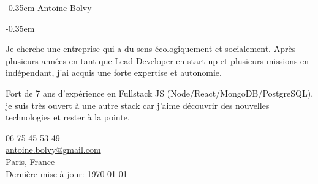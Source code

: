\documentclass[
  french,
  a4paper
]{resume-openfont}
\begin{document}
\noindent%
\begin{minipage}{.7\textwidth}
\kern-0.35em
{
  \fontsize{24}{24}
  \selectfont Antoine Bolvy\\
}

\kern-0.35em
{
  \parskip2pt
  \fontsize{8pt}{10pt}
  \selectfont Je cherche une entreprise qui a du sens écologiquement et socialement. Après plusieurs années en tant que Lead Developer en start-up et plusieurs missions en indépendant, j'ai acquis une forte expertise et autonomie.\par
  Fort de 7 ans d'expérience en Fullstack JS (Node/React/MongoDB/PostgreSQL), je suis très ouvert à une autre stack car j'aime découvrir des nouvelles technologies et rester à la pointe.
}%
\vspace{12pt}


\end{minipage}%
\begin{minipage}{.3\textwidth}
\begin{flushright}
\vspace{-28pt}
\color{headings}\href{tel:+33675455349}{06 75 45 53 49}\\
\href{mailto:antoine.bolvy@gmail.com}{antoine.bolvy@gmail.com}\\
Paris, France\\
{\color{date}\fontsize{7pt}{12pt}\selectfont{}Dernière mise à jour: \today}
\end{flushright}
\end{minipage}

\vspace{-4pt}
\noindent\makebox[\linewidth]{
{\color{headingsrulegray}\rule{\paperwidth}{0.4pt}}}
\vspace{-16pt}

%
%
\end{document}
